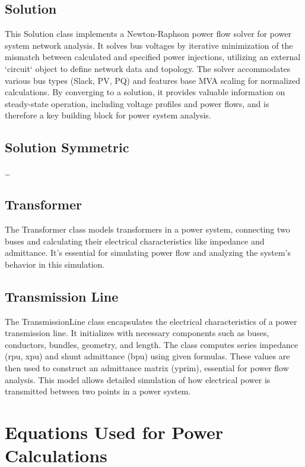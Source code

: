 \documentclass{article}
\begin{document}
	\subsection{Solution}
	This Solution class implements a Newton-Raphson power flow solver for power system network analysis. It solves bus voltages by iterative minimization of the mismatch between calculated and specified power injections, utilizing an external `circuit` object to define network data and topology. The solver accommodates various bus types (Slack, PV, PQ) and features base MVA scaling for normalized calculations. By converging to a solution, it provides valuable information on steady-state operation, including voltage profiles and power flows, and is therefore a key building block for power system analysis.

	\subsection{Solution Symmetric}
	\dots	
	
	\subsection{Transformer}
	The Transformer class models transformers in a power system, connecting two buses and calculating their electrical characteristics like impedance and admittance. It's essential for simulating power flow and analyzing the system's behavior in this simulation.
	
	\subsection{Transmission Line}
	The TransmissionLine class encapsulates the electrical characteristics of a power transmission line. It initializes with necessary components such as buses, conductors, bundles, geometry, and length. The class computes series impedance (rpu, xpu) and shunt admittance (bpu) using given formulas. These values are then used to construct an admittance matrix (yprim), essential for power flow analysis. This model allows detailed simulation of how electrical power is transmitted between two points in a power system.
	
	\section{Equations Used for Power Calculations}
\end{document}

